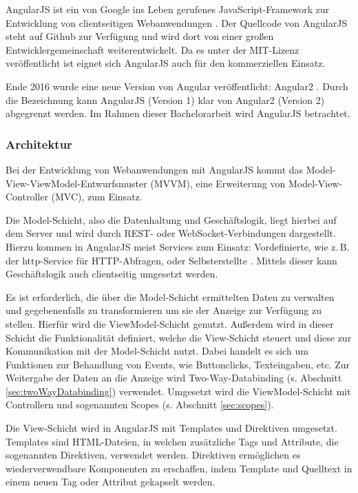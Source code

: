AngularJS ist ein von Google ins Leben gerufenes JavaScript-Framework zur Entwicklung von clientseitigen Webanwendungen \cite{angular-faq}. Der Quellcode von AngularJS steht auf Github zur Verfügung und wird dort von einer großen Entwicklergemeinschaft weiterentwickelt\cite[][9]{ng-book}. Da es unter der MIT-Lizenz veröffentlicht ist eignet sich AngularJS auch für den kommerziellen Einsatz\cites[9]{ng-book}[]{mit-license}.

Ende 2016 wurde eine neue Version von Angular veröffentlicht: Angular2 \cite{ng2-out}. Durch die Bezeichnung kann AngularJS (Version 1) klar von Angular2 (Version 2) abgegrenzt werden. Im Rahmen dieser Bachelorarbeit wird AngularJS betrachtet.

\subsubsection{Architektur}
Bei der Entwicklung von Webanwendungen mit AngularJS kommt das Model-View-ViewModel-Entwurfsmuster (MVVM), eine Erweiterung von Model-View-Controller (MVC), zum Einsatz\cite[][21]{angular-boehm}. 

Die Model-Schicht, also die Datenhaltung und Geschäftslogik, liegt hierbei auf dem Server und wird durch REST- oder WebSocket-Verbindungen dargestellt. Hierzu kommen in AngularJS meist Services zum Einsatz: Vordefinierte, wie z.\,B. der http-Service für HTTP-Abfragen, oder Selbsterstellte \cite{angular-services}. Mittels dieser kann Geschäftslogik auch clientseitig umgesetzt werden.\cite[][21]{angular-boehm}

Es ist erforderlich, die über die Model-Schicht ermittelten Daten zu verwalten und gegebenenfalls zu transformieren um sie der Anzeige zur Verfügung zu stellen. Hierfür wird die ViewModel-Schicht genutzt. Außerdem wird in dieser Schicht die Funktionalität definiert, welche die View-Schicht steuert und diese zur Kommunikation mit der Model-Schicht nutzt. Dabei handelt es sich um Funktionen zur Behandlung von Events, wie Buttonclicks, Texteingaben, etc. Zur Weitergabe der Daten an die Anzeige wird Two-Way-Databinding (s. Abschnitt \ref{sec:twoWayDatabinding}) verwendet. Umgesetzt wird die ViewModel-Schicht mit Controllern und sogenannten Scopes (s. Abschnitt \ref{sec:scopes}). \cite[][21\psq]{angular-boehm}

Die View-Schicht wird in AngularJS mit Templates und Direktiven umgesetzt. Templates sind HTML-Dateien, in welchen zusätzliche Tags und Attribute, die sogenannten Direktiven, verwendet werden. \cite[][1\psqq]{angular-boehm}Direktiven ermöglichen es wiederverwendbare Komponenten zu erschaffen, indem Template und Quelltext in einem neuen Tag oder Attribut gekapselt werden\cite[][49\psq]{angular-boehm}.

